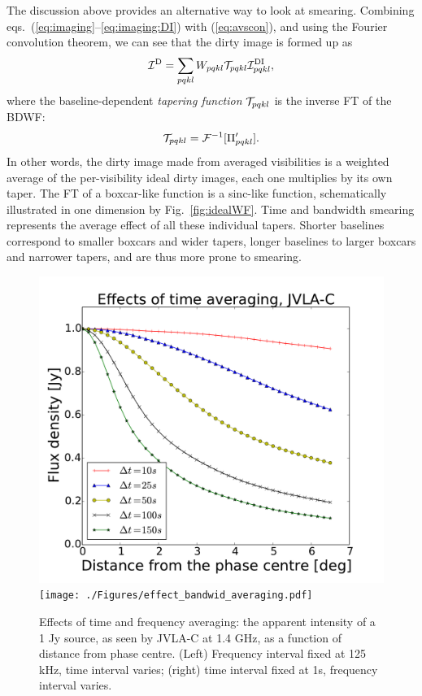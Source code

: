 \documentclass[useAMS,usenatbib]{mn2e}
\begin{document}
The discussion above provides an alternative way to look at smearing. Combining eqs.~(\ref{eq:imaging}--\ref{eq:imaging:DI}) with 
(\ref{eq:avscon}), and using the Fourier convolution theorem, we can see that the dirty image is formed up as
\begin{equation}
\mathcal{I}^\mathrm{D} =  \sum_{pqkl} W_{pqkl}  \mathcal{T}_{pqkl} \mathcal{I}^\mathrm{DI}_{pqkl},
\end{equation}
where the baseline-dependent \emph{tapering function} $\mathcal{T}_{pqkl}$ is the inverse FT of the BDWF:
\begin{equation}
\mathcal{T}_{pqkl} = \mathcal{F}^{-1}[ \Pi^{\prime}_{pqkl}].
\end{equation}
In other words, the dirty image made from averaged visibilities is a weighted average of the per-visibility ideal dirty images, 
each one multiplies by its own taper. The FT of a boxcar-like function is a sinc-like function, schematically illustrated in one
dimension by Fig.~\ref{fig:idealWF}. Time and bandwidth smearing represents the average effect 
of all these individual tapers. Shorter baselines correspond to smaller boxcars and wider tapers, longer baselines to larger 
boxcars and narrower tapers, and are thus more prone to smearing.

\begin{figure}
\includegraphics[width=\columnwidth]{./Figures/effect_time_averaging.pdf}%
\texttt{[image: ./Figures/effect\_bandwid\_averaging.pdf]}
\caption{Effects of time and frequency averaging: the apparent intensity of a 1 Jy source, as seen by JVLA-C at 1.4 GHz, 
as a function of distance from phase centre. (Left) Frequency interval fixed at 125 kHz, time interval varies; 
(right) time interval fixed at 1s, frequency interval varies.}\label{fig:smear}
\end{figure}
\end{document}
